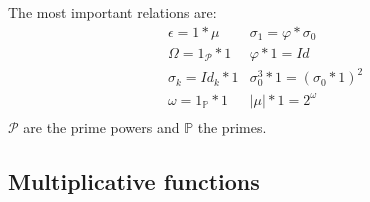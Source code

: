  The most important relations are:
 \begin{align*}
	&\epsilon = 1*\mu & \sigma_1 =\varphi * \sigma_0 \\
	&\Omega = 1_{\mathcal{P}}*1 & \varphi * 1 = Id \\
	&\sigma_k = Id_k* 1 & \sigma_0^3*1 = (\sigma_0 *1)^2 \\
	&\omega = 1_{\mathbb{P}}*1 & |\mu|*1= 2^\omega \\
 \end{align*}
 $\mathcal{P}$ are the prime powers and $\mathbb{P}$ the primes.
\subsection{Multiplicative functions}
